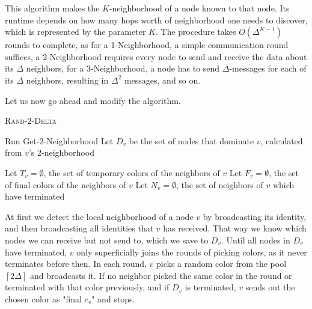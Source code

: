 
This algorithm makes the $K$-neighborhood of a node known to that node. Its runtime depends on how many hops worth of neighborhood one needs to discover, which is represented by the parameter $K$. The procedure takes $O(\Delta^{K-1})$ rounds to complete, as for a 1-Neighborhood, a simple communication round suffices, a 2-Neighborhood requires every node to send and receive the data about its $\Delta$ neighbors, for a 3-Neighborhood, a node has to send $\Delta$-messages for each of its $\Delta$ neighbors, resulting in $\Delta^2$ messages, and so on.

Let us now go ahead and modify the algorithm.
\begin{algorithm}[ht]
\DontPrintSemicolon 
\caption{\textsc{Rand-2-Delta}}\label{alg:r2d}

Run Get-$2$-Neighborhood \;
Let $D_v$ be the set of nodes that dominate $v$, calculated from $v$'s 2-neighborhood\;

Let $T_v = \emptyset$, the set of temporary colors of the neighbors of $v$\;
Let $F_v = \emptyset$, the set of final colors of the neighbors of $v$\;
Let $N_v = \emptyset$, the set of neighbors of $v$ which have terminated\;



\end{algorithm}

At first we detect the local neighborhood of a node $v$ by broadcasting its identity, and then broadcasting all identities that $v$ has received. That way we know which nodes we can receive but not send to, which we save to $D_v$. Until all nodes in $D_v$ have terminated, $v$ only superficially joins the rounds of picking colors, as it never terminates before then. In each round, $v$ picks a random color from the pool $[2\Delta]$ and broadcasts it. If no neighbor picked the same color in the round or terminated with that color previously, and if $D_v$ is terminated, $v$ sends out the chosen color as "final $c_v$" and stops.

